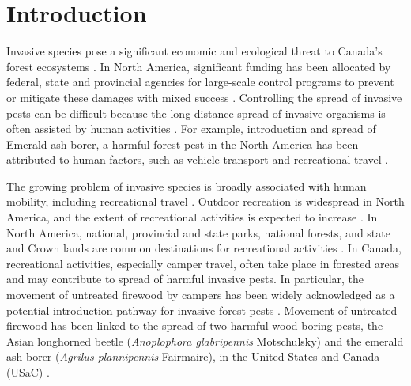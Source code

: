 \section{Introduction}
Invasive species pose a significant economic and ecological threat to Canada’s forest ecosystems \cite{wilson2009something,jacobi2011firewood}. In North America, significant funding has been allocated by federal, state and provincial agencies for large-scale control programs to prevent or mitigate these damages with mixed success \cite{tobin2008cost,nisc2007}. Controlling the spread of invasive pests can be difficult because the long-distance spread of invasive organisms is often assisted by human activities \cite{kolar2001progress,wilson2009something}. For example, introduction and spread of Emerald ash borer, a harmful forest pest in the North America \cite{kovacs2010cost,kovacs2014bioeconomic,poland2006emerald} has been attributed to human factors, such as vehicle transport \cite{buck2009hitchhiking} and recreational travel \cite{koch2014using}.  

The growing problem of invasive species is broadly associated with human mobility, including recreational travel \cite{kolar2001progress,wilson2009something,liebhold2008population,prasad2010modeling}. Outdoor recreation is widespread in North America, and the extent of recreational activities is expected to increase \cite{cordell2008nature,cordell2008latest,cordell2012outdoor}. In North America, national, provincial and state parks, national forests, and state and Crown lands are common destinations for recreational activities \cite{eagles2002trends,siikamaki2011contributions}. In Canada, recreational activities, especially camper travel, often take place in forested areas and may contribute to spread of harmful invasive pests. In particular, the movement of untreated firewood by campers has been widely acknowledged as a potential introduction pathway for invasive forest pests \cite{barlow2014modelling,tobin2010does,peterson2012motivation,koch2014using,jacobi2011firewood}. Movement of untreated firewood has been linked to the spread of two harmful wood-boring pests, the Asian longhorned beetle (\textit{Anoplophora glabripennis} Motschulsky) and the emerald ash borer (\textit{Agrilus plannipennis} Fairmaire), in the United States and Canada (USaC) \cite{haack1997new,petrice2006effects}. 

